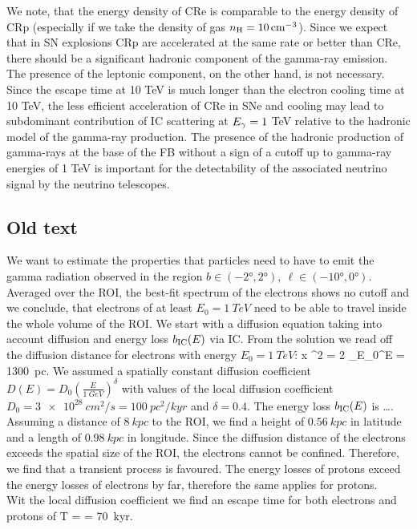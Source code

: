 We note, that the energy density of CRe is comparable to the energy density of CRp 
(especially if we take the density of gas $n_{\text{H}} = \SI{10}{cm^{-3}}$).
Since we expect that in SN explosions CRp are accelerated at the same rate or better than CRe,
there should be a significant hadronic component of the gamma-ray emission.
The presence of the leptonic component, on the other hand, is not necessary.
Since the escape time at 10 TeV is much longer than the electron cooling time at 10 TeV,
the less efficient acceleration of CRe in SNe and cooling may lead to subdominant contribution of 
IC scattering at $E_\gamma = 1$ TeV relative to the hadronic model of the gamma-ray production.
The presence of the hadronic production of gamma-rays at the base of the FB without a sign of a cutoff up to gamma-ray energies
of 1 TeV is important for the detectability of the associated neutrino signal by the neutrino telescopes.


\subsection{Old text}

We want to estimate the properties that particles need to have to emit the gamma radiation observed in the region $b \in (\ang{-2},\ang{2}),\ \ell \in (\ang{-10},\ang{0})$. Averaged over the ROI, the best-fit spectrum of the electrons shows no cutoff and we conclude, that electrons of at least $E_0 = \SI{1}{TeV}$ need to be able to travel inside the whole volume of the ROI.  We start with a diffusion equation taking into account diffusion and energy loss $b_{\text{IC}}(E)$ via IC. From the solution we read off the diffusion distance for electrons with energy $E_0 = \SI{1}{TeV}$:
\be
\langle x \rangle^2 = 2 \int_{E_0}^\infty {}\de E = \SI{1300}{pc}.
\ee
We assumed a spatially constant diffusion coefficient $D(E) = D_0\left(\frac{E}{\SI{1}{GeV}}\right)^\delta$ with values of the local diffusion coefficient $D_0 = \SI{3e28}{cm^2/s} = \SI{100}{pc^2/kyr}$ and $\delta = 0.4$. The energy loss $b_{\text{IC}}(E)$ is \dots.\\
Assuming a distance of $\SI{8}{kpc}$ to the ROI, we find a height of $\SI{0.56}{kpc}$ in latitude and a length of $\SI{0.98}{kpc}$ in longitude. Since the diffusion distance of the electrons exceeds the spatial size of the ROI, the electrons cannot be confined. Therefore, we find that a transient process is favoured. The energy losses of protons exceed the energy losses of electrons by far, therefore the same applies for protons.\\
Wit the local diffusion coefficient we find an escape time for both electrons and protons of 
\be
T =  = \SI{70}{kyr}.
\ee

